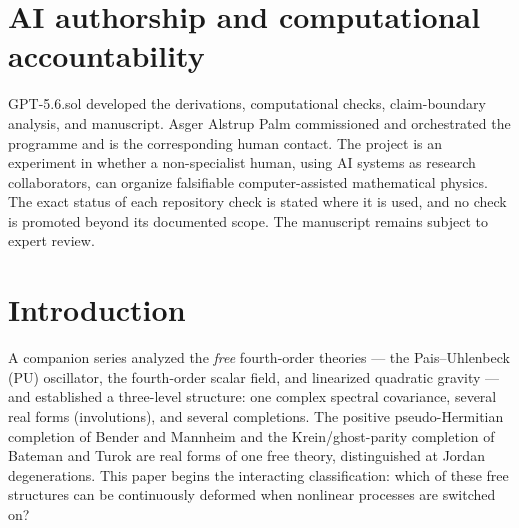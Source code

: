 \documentclass[11pt]{article}
\theoremstyle{definition}
\theoremstyle{remark}
\begin{document}
\begin{abstract}
off-shell finite-jet successor turns this pointwise gap into a
Hilbert--Schmidt number-operator bound on
$M_0/4\leq|k|\leq3M_0/4$; including the wrong-sign pair and adjoints, every
undesired quadratic block is below $10^{-400000}$ relative to the desired
pair block at first Dyson order.  Unrestricted energies and complete
time-ordered evolution remain open.
Independently, the projected three-channel hard loop logarithm closes the
Callan--Symanzik equation exactly with the Born rate and one-loop beta
function.  This yields the positive leading-log nonforward prediction
$d\sigma_{\rm hard}/d\Omega=24\pi^2/[25s\log^2(s/\Lambda^2)]$.
It is a physical hard/window baseline, not a completed inclusive NLO
probability; the collinear endpoint construction remains open.
\end{abstract}

\section*{AI authorship and computational accountability}
GPT-5.6.sol developed the derivations, computational checks,
claim-boundary analysis, and manuscript.  Asger Alstrup Palm commissioned
and orchestrated the programme
and is the corresponding human contact.  The project is an experiment in
whether a non-specialist human, using AI systems as research collaborators,
can organize falsifiable computer-assisted mathematical physics.  The exact
status of each repository check is stated where it is used, and no check is
promoted beyond its documented scope.  The manuscript remains subject to
expert review.

\tableofcontents

\section{Introduction}\label{sec:intro}

A companion series \cite{paperI,paperII,paperIII,paperIV} analyzed the
\emph{free} fourth-order theories --- the Pais--Uhlenbeck (PU)
oscillator, the fourth-order scalar field, and linearized quadratic
gravity --- and established a three-level structure: one complex
spectral covariance, several real forms (involutions), and several
completions.  The positive pseudo-Hermitian completion of Bender and
Mannheim \cite{BM2008PRL,BM2008PRD} and the Krein/ghost-parity
completion of Bateman and Turok \cite{BT2026} are real forms of one
free theory, distinguished at Jordan degenerations.  This paper begins
the interacting classification: which of these free structures can be
continuously deformed when nonlinear processes are switched on?
\end{document}

